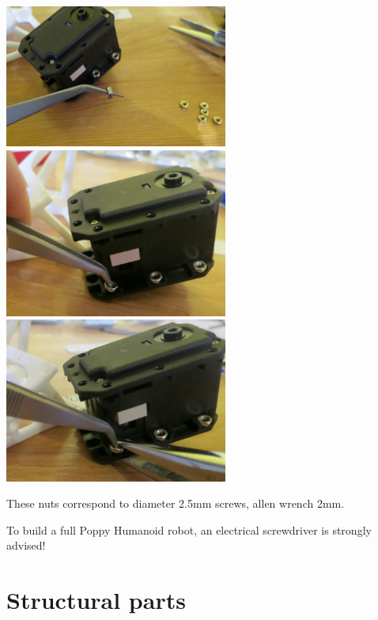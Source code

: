 \documentclass{article}
\begin{document}
 \begin{center}
  \includegraphics[width=0.55\textwidth]{img/nuts1}
  \includegraphics[width=0.55\textwidth]{img/nuts2}
  \includegraphics[width=0.55\textwidth]{img/nuts3}
 \end{center}
 
 These nuts correspond to diameter 2.5mm screws, allen wrench 2mm.
 
 To build a full Poppy Humanoid robot, an electrical screwdriver is strongly advised!

\section{Structural parts}
\end{document}
